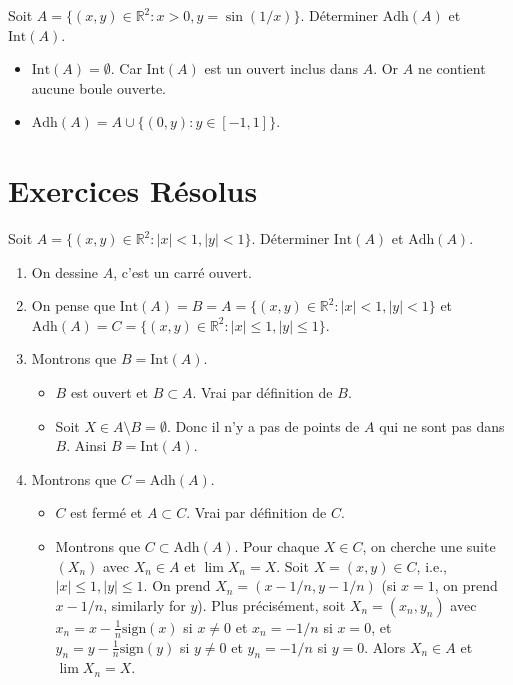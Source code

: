 \documentclass[oneside]{book}
\begin{document}
\begin{example}
Soit $A = \{(x,y) \in \mathbb{R}^2 : x > 0, y = \sin(1/x)\}$. Déterminer $\mathrm{Adh}(A)$ et $\mathrm{Int}(A)$.
\begin{itemize}
    \item $\mathrm{Int}(A) = \emptyset$. Car $\mathrm{Int}(A)$ est un ouvert inclus dans $A$. Or $A$ ne contient aucune boule ouverte.
    \item $\mathrm{Adh}(A) = A \cup \{(0,y) : y \in [-1, 1]\}$.
\end{itemize}
\end{example}

\section{Exercices Résolus}

\begin{example}
Soit $A = \{(x,y) \in \mathbb{R}^2 : |x| < 1, |y| < 1\}$. Déterminer $\mathrm{Int}(A)$ et $\mathrm{Adh}(A)$.
\end{example}

\begin{solution}
\begin{enumerate}
    \item On dessine $A$, c'est un carré ouvert.
    \item On pense que $\mathrm{Int}(A) = B = A = \{(x,y) \in \mathbb{R}^2 : |x| < 1, |y| < 1\}$ et $\mathrm{Adh}(A) = C = \{(x,y) \in \mathbb{R}^2 : |x| \leq 1, |y| \leq 1\}$.
    \item Montrons que $B = \mathrm{Int}(A)$.
    \begin{itemize}
        \item $B$ est ouvert et $B \subset A$. Vrai par définition de $B$.
        \item Soit $X \in A \setminus B = \emptyset$. Donc il n'y a pas de points de $A$ qui ne sont pas dans $B$. Ainsi $B = \mathrm{Int}(A)$.
    \end{itemize}
    \item Montrons que $C = \mathrm{Adh}(A)$.
    \begin{itemize}
        \item $C$ est fermé et $A \subset C$. Vrai par définition de $C$.
        \item Montrons que $C \subset \mathrm{Adh}(A)$. Pour chaque $X \in C$, on cherche une suite $(X_n)$ avec $X_n \in A$ et $\lim X_n = X$. Soit $X = (x, y) \in C$, i.e., $|x| \leq 1, |y| \leq 1$. On prend $X_n = (x - 1/n, y - 1/n)$ (si $x = 1$, on prend $x - 1/n$, similarly for $y$). Plus précisément, soit $X_n = (x_n, y_n)$ avec $x_n = x - \frac{1}{n} \text{sign}(x)$ si $x \neq 0$ et $x_n = -1/n$ si $x = 0$, et $y_n = y - \frac{1}{n} \text{sign}(y)$ si $y \neq 0$ et $y_n = -1/n$ si $y = 0$. Alors $X_n \in A$ et $\lim X_n = X$.
    \end{itemize}
\end{enumerate}
\end{solution}
\end{document}
